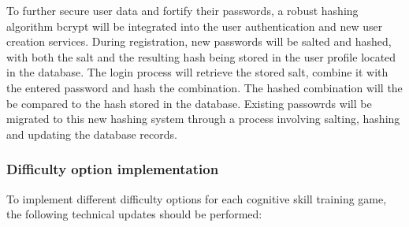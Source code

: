 \documentclass[11pt,a4paper]{article}
\begin{document}
To further secure user data and fortify their passwords, a robust hashing algorithm bcrypt will be integrated into the user authentication and new user creation services. During registration, new passwords will be salted and hashed, with both the salt and the resulting hash being stored in the user profile located in the database. The login process will retrieve the stored salt, combine it with the entered password and hash the combination. The hashed combination will the be compared to the hash stored in the database. Existing passowrds will be migrated to this new hashing system through a process involving salting, hashing and updating the database records.

\subsubsection{Difficulty option implementation}
To implement different difficulty options for each cognitive skill training game, the following technical updates should be performed:
\end{document}
